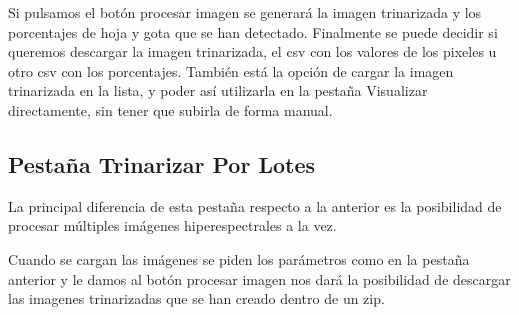 
Si pulsamos el botón procesar imagen se generará la imagen trinarizada y los porcentajes de hoja y gota que se han detectado. Finalmente se puede decidir si queremos descargar la imagen trinarizada, el csv con los valores de los pixeles u otro csv con los porcentajes. También está la opción de cargar la imagen trinarizada en la lista, y poder así utilizarla en la pestaña Visualizar directamente, sin tener que subirla de forma manual.


\subsection{Pestaña Trinarizar Por Lotes}
La principal diferencia de esta pestaña respecto a la anterior es la posibilidad de procesar múltiples imágenes hiperespectrales a la vez. 


Cuando se cargan las imágenes se piden los parámetros como en la pestaña anterior y le damos al botón procesar imagen nos dará la posibilidad de descargar las imagenes trinarizadas que se han creado dentro de un zip.


